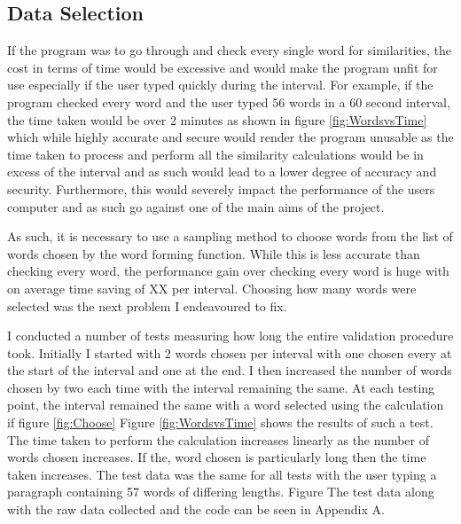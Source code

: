 \documentclass[10pt,a4paper]{report}
\begin{document}
\subsection{Data Selection}

If the program was to go through and check every single word for similarities, the cost in terms of time would be excessive and would make the program unfit for use especially if the user typed quickly during the interval. For example, if the program checked every word and the user typed 56 words in a 60 second interval, the time taken would be over 2 minutes as shown in figure \ref{fig:WordsvsTime} which while highly accurate and secure would render the program unusable as the time taken to process and perform all the similarity calculations would be in excess of the interval and as such would lead to a lower degree of accuracy and security. Furthermore, this would severely impact the performance of the users computer and as such go against one of the main aims of the project.

As such, it is necessary to use a sampling method to choose words from the list of words chosen by the word forming function. While this is less accurate than checking every word, the performance gain over checking every word is huge with on average time saving of XX per interval. Choosing how many words were selected was the next problem I endeavoured to fix.

I conducted a number of tests measuring how long the entire validation procedure took. Initially I started with 2 words chosen per interval with one chosen every at the start of the interval and one at the end. I then increased the number of words chosen by two each time with the interval remaining the same. At each testing point, the interval remained the same with a word selected using the calculation if figure \ref{fig:Choose} Figure \ref{fig:WordsvsTime} shows the results of such a test. The time taken to perform the calculation increases linearly as the number of words chosen increases. If the, word chosen is particularly long then the time taken increases. The test data was the same for all tests with the user typing a paragraph containing 57 words of differing lengths. Figure The test data along with the raw data collected and the code can be seen in Appendix A. 
\end{document}
